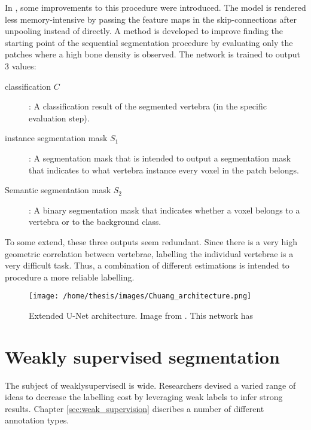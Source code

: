 \par{
    In \cite{Chuang2019}, some improvements to this procedure were introduced.
    The model is rendered less memory-intensive by passing the feature maps in the skip-connections after unpooling instead of directly.
    A method is developed to improve finding the starting point of the sequential segmentation procedure by evaluating only the patches where a high bone density is observed.
    The network is trained to output 3 values:
    \begin{description}
        \item[classification $C$]: A classification result of the segmented vertebra (in the specific evaluation step).
        \item[instance segmentation mask $S_1$]: A segmentation mask that is intended to output a segmentation mask that indicates to what vertebra instance every voxel in the patch belongs. 
        \item[Semantic segmentation mask $S_2$]: A binary segmentation mask that indicates whether a voxel belongs to a vertebra or to the background class.
    \end{description}
    To some extend, these three outputs seem redundant. 
    Since there is a very high geometric correlation between vertebrae, labelling the individual vertebrae is a very difficult task.
    Thus, a combination of different estimations is intended to procedure a more reliable labelling.
}
\begin{SCfigure}[][htb]
    \texttt{[image: /home/thesis/images/Chuang\_architecture.png]}
    \caption{Extended U-Net architecture. Image from \cite{Chuang2019}.
    This network has }
    \label{fig:chuang_architecture}
\end{SCfigure}



\section{Weakly supervised segmentation\label{sec:PreviousWork_weaklySupervised}}
\par{
    The subject of \Gls{weaklysupervisedl} is wide.
    Researchers devised a varied range of ideas to decrease the labelling cost by leveraging weak labels to infer strong results.
    Chapter \ref{sec:weak_supervision} discribes a number of different annotation types.
}
